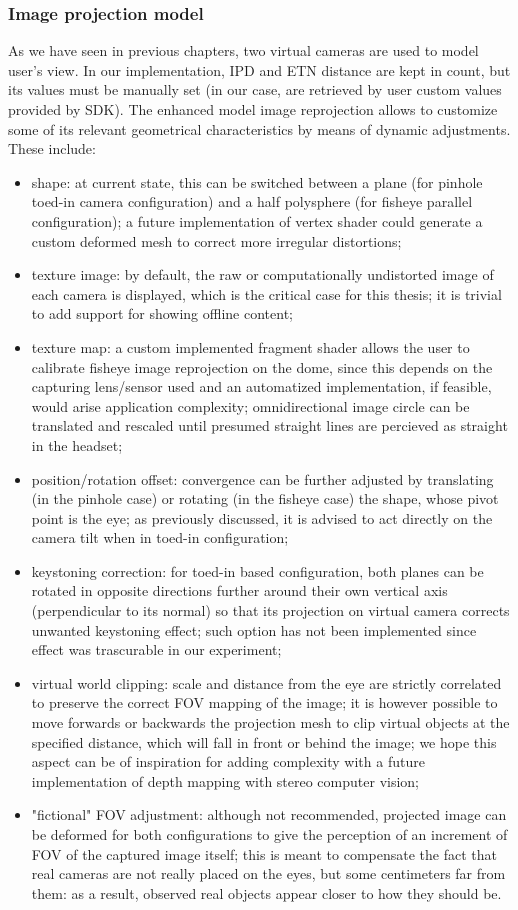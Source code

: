 \subsubsection{Image projection model}
As we have seen in previous chapters, two virtual cameras are used to model user's view. In our implementation, IPD and ETN distance are kept in count, but its values must be manually set (in our case, are retrieved by user custom values provided by SDK). The enhanced model image reprojection allows to customize some of its relevant geometrical characteristics by means of dynamic adjustments. These include:
\begin{itemize}
\item shape: at current state, this can be switched between a plane (for pinhole toed-in camera configuration) and a half polysphere (for fisheye parallel configuration); a future implementation of vertex shader could generate a custom deformed mesh to correct more irregular distortions;
\item texture image: by default, the raw or computationally undistorted image of each camera is displayed, which is the critical case for this thesis; it is trivial to add support for showing offline content;
\item texture map: a custom implemented fragment shader allows the user to calibrate fisheye image reprojection on the dome, since this depends on the capturing lens/sensor used and an automatized implementation, if feasible, would arise application complexity; omnidirectional image circle can be translated and rescaled until presumed straight lines are percieved as straight in the headset;
\item position/rotation offset: convergence can be further adjusted by translating (in the pinhole case) or rotating (in the fisheye case) the shape, whose pivot point is the eye; as previously discussed, it is advised to act directly on the camera tilt when in toed-in configuration;
\item keystoning correction: for toed-in based configuration, both planes can be rotated in opposite directions further around their own vertical axis (perpendicular to its normal) so that its projection on virtual camera corrects unwanted keystoning effect; such option has not been implemented since effect was trascurable in our experiment;
\item virtual world clipping: scale and distance from the eye are strictly correlated to preserve the correct FOV mapping of the image; it is however possible to move forwards or backwards the projection mesh to clip virtual objects at the specified distance, which will fall in front or behind the image; we hope this aspect can be of inspiration for adding complexity with a future implementation of depth mapping with stereo computer vision;
\item "fictional" FOV adjustment: although not recommended, projected image can be deformed for both configurations to give the perception of an increment of FOV of the captured image itself; this is meant to compensate the fact that real cameras are not really placed on the eyes, but some centimeters far from them: as a result, observed real objects appear closer to how they should be.
\end{itemize}


